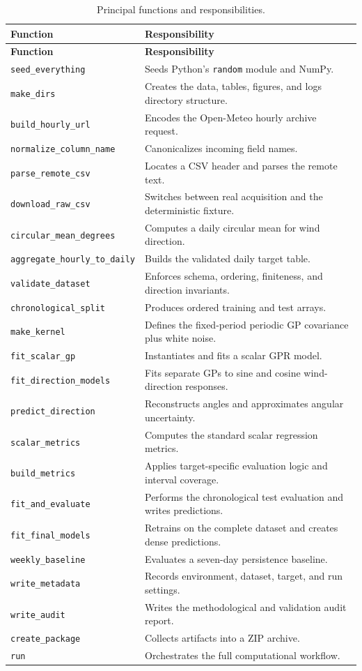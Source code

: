 \documentclass[11pt,a4paper]{article}
\newcommand{\code}[1]{\texttt{#1}}
\begin{document}
\small\begin{longtable}{p{}p{}}
\caption{Principal functions and responsibilities.}\label{tab:functions}\\
\toprule
\textbf{Function} & \textbf{Responsibility}\\
\midrule
\endfirsthead
\toprule
\textbf{Function} & \textbf{Responsibility}\\
\midrule
\endhead
\code{seed\_everything} & Seeds Python's \code{random} module and NumPy.\\
\code{make\_dirs} & Creates the data, tables, figures, and logs directory structure.\\
\code{build\_hourly\_url} & Encodes the Open-Meteo hourly archive request.\\
\code{normalize\_column\_name} & Canonicalizes incoming field names.\\
\code{parse\_remote\_csv} & Locates a CSV header and parses the remote text.\\
\code{download\_raw\_csv} & Switches between real acquisition and the deterministic fixture.\\
\code{circular\_mean\_degrees} & Computes a daily circular mean for wind direction.\\
\code{aggregate\_hourly\_to\_daily} & Builds the validated daily target table.\\
\code{validate\_dataset} & Enforces schema, ordering, finiteness, and direction invariants.\\
\code{chronological\_split} & Produces ordered training and test arrays.\\
\code{make\_kernel} & Defines the fixed-period periodic GP covariance plus white noise.\\
\code{fit\_scalar\_gp} & Instantiates and fits a scalar GPR model.\\
\code{fit\_direction\_models} & Fits separate GPs to sine and cosine wind-direction responses.\\
\code{predict\_direction} & Reconstructs angles and approximates angular uncertainty.\\
\code{scalar\_metrics} & Computes the standard scalar regression metrics.\\
\code{build\_metrics} & Applies target-specific evaluation logic and interval coverage.\\
\code{fit\_and\_evaluate} & Performs the chronological test evaluation and writes predictions.\\
\code{fit\_final\_models} & Retrains on the complete dataset and creates dense predictions.\\
\code{weekly\_baseline} & Evaluates a seven-day persistence baseline.\\
\code{write\_metadata} & Records environment, dataset, target, and run settings.\\
\code{write\_audit} & Writes the methodological and validation audit report.\\
\code{create\_package} & Collects artifacts into a ZIP archive.\\
\code{run} & Orchestrates the full computational workflow.\\
\bottomrule
\end{longtable}
\end{document}
